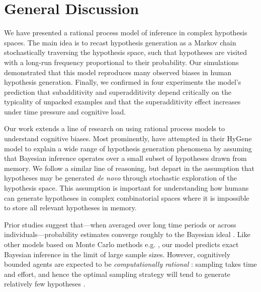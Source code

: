 

\section{General Discussion}

We have presented a rational process model of inference in complex hypothesis spaces. The main idea is to recast hypothesis generation as a Markov chain stochastically traversing the hypothesis space, such that hypotheses are visited with a long-run frequency proportional to their probability. Our simulations demonstrated that this model reproduces many observed biases in human hypothesis generation. Finally, we confirmed in four experiments the model's prediction that subadditivity and superadditivity depend critically on the typicality of unpacked examples and that the superadditivity effect increases under time pressure and cognitive load.

Our work extends a line of research on using rational process models to understand cognitive biases. Most prominently, \citet{Thomas2008} have attempted in their HyGene model to explain a wide range of hypothesis generation phenomena by assuming that Bayesian inference operates over a small subset of hypotheses drawn from memory. We follow a similar line of reasoning, but depart in the assumption that hypotheses may be generated \emph{de novo} through stochastic exploration of the hypothesis space. This assumption is important for understanding how humans can generate hypotheses in complex combinatorial spaces where it is impossible to store all relevant hypotheses in memory.

Prior studies suggest that---when averaged over long time periods or across individuals---probability estimates converge roughly to the Bayesian ideal \citep{Vul2014}. Like other models based on Monte Carlo methods e.g. \citet{multistability,lieder2017empirical,lieder2017anchoring,shi10}, our model predicts exact Bayesian inference in the limit of large sample sizes. However, cognitively bounded agents are expected to be \emph{computationally rational} \citep{Gershman2015}: sampling takes time and effort, and hence the optimal sampling strategy will tend to generate relatively few hypotheses \citep{Vul2014}. 

